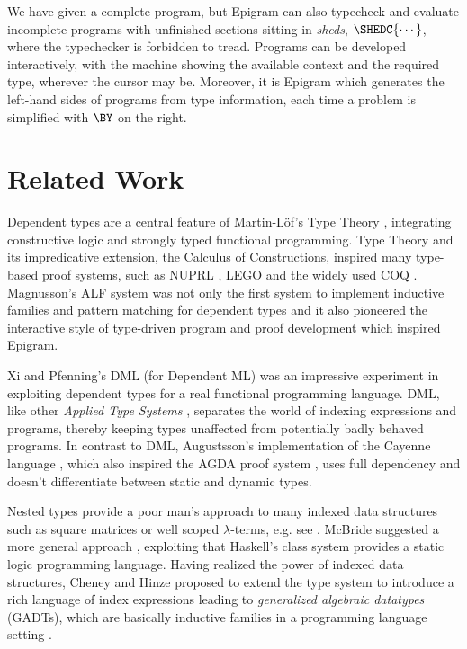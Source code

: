 \documentclass{fundam}
\begin{document}
We have given a complete program, but Epigram can also typecheck and
evaluate incomplete programs with unfinished sections sitting in
\emph{sheds}, $\SHEDC{\cdots}$, where the typechecker is forbidden to
tread. Programs can be developed interactively, with the machine
showing the available context and the required type, wherever the
cursor may be. Moreover, it is Epigram which generates the left-hand
sides of programs from type information, each time a problem is
simplified with $\BY$ on the right.


\section{Related Work}

Dependent types are a central feature of Martin-L\"of's Type
Theory \cite{martinloef:intuitionistic,nordstrom:programming}, integrating constructive
logic and strongly typed functional programming. Type Theory and its
impredicative extension, the Calculus of Constructions, inspired many
type-based proof systems, such as NUPRL \cite{nuprl-book}, LEGO
\cite{luo.pollack:legomanual} and the widely used COQ
\cite{CoqManualV8}. Magnusson's ALF system \cite{magnusson.nordstrom:alf}
was not only the first system to
implement inductive families \cite{dybjer:families} and pattern
matching for dependent types \cite{coquand:patternmatching} and it
also pioneered the interactive style of type-driven program and proof
development which inspired Epigram.

Xi and Pfenning's DML (for Dependent ML) \cite{DML99} was an
impressive experiment in exploiting dependent types for a real
functional programming language. DML, like other \emph{Applied Type
  Systems} \cite{ATStypes03}, separates the world of indexing
expressions and programs, thereby 
keeping types unaffected from potentially badly behaved programs.  In contrast to
DML, Augustsson's implementation of the Cayenne language
\cite{augustsson:cayenne}, which also inspired the AGDA proof system
\cite{coquand99structured}, uses full dependency and doesn't
differentiate between static and dynamic types.

Nested types provide a poor man's approach to many indexed
data structures such as square matrices or well scoped $\lambda$-terms,
e.g. see \cite{Hin00Man}. McBride suggested a more general approach
\cite{conor:faking}, exploiting that Haskell's class system provides a
static logic programming language. Having realized the power of
indexed data structures, Cheney and Hinze \cite{ChH03Pha} proposed
to extend the type system to introduce a rich language of index
expressions leading to \emph{generalized
  algebraic datatypes} (GADTs), which are basically inductive families
in a programming language setting \cite{sheard-04,peyton-jones-wobbly}.
\end{document}
